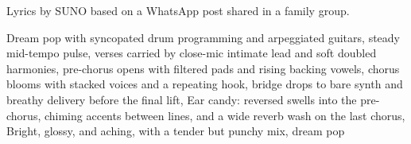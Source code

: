 
\begin{notes}
Lyrics by SUNO based on a WhatsApp post shared in a family group.
\end{notes}
\begin{style}
Dream pop with syncopated drum programming and arpeggiated guitars, steady mid-tempo pulse, verses carried by close-mic intimate lead and soft doubled harmonies, pre-chorus opens with filtered pads and rising backing vowels, chorus blooms with stacked voices and a repeating hook, bridge drops to bare synth and breathy delivery before the final lift, Ear candy: reversed swells into the pre-chorus, chiming accents between lines, and a wide reverb wash on the last chorus, Bright, glossy, and aching, with a tender but punchy mix, dream pop
\end{style}
